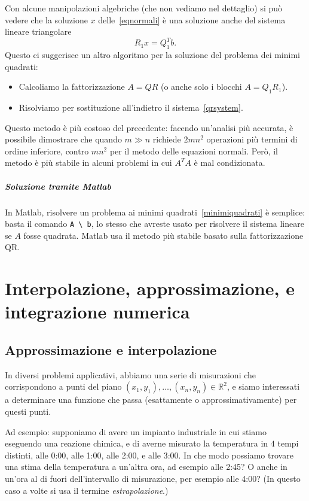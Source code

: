 \documentclass[a4paper]{report}
\theoremstyle{definiton}
\theoremstyle{remark}
\begin{document}
Con alcune manipolazioni algebriche (che non vediamo nel dettaglio) si può vedere che la soluzione $x$ delle~\eqref{eqnormali} è una soluzione anche del sistema lineare triangolare
\begin{equation} \label{qrsystem}
    R_1 x = Q_1^T b.    
\end{equation}
Questo ci suggerisce un altro algoritmo per la soluzione del problema dei minimi quadrati:
\begin{itemize}
    \item Calcoliamo la fattorizzazione $A=QR$ (o anche solo i blocchi $A = Q_1 R_1$).
    \item Risolviamo per sostituzione all'indietro il sistema~\eqref{qrsystem}.
\end{itemize}
Questo metodo è più costoso del precedente: facendo un'analisi più accurata, è possibile dimostrare che quando $m\gg n$ richiede $2mn^2$ operazioni più termini di ordine inferiore, contro $mn^2$ per il metodo delle equazioni normali. Però, il metodo è più stabile in alcuni problemi in cui $A^TA$ è mal condizionata.

\paragraph{Soluzione tramite Matlab} In Matlab, risolvere un problema ai minimi quadrati~\eqref{minimiquadrati} è semplice: basta il comando \lstinline{A \ b}, lo stesso che avreste usato per risolvere il sistema lineare se $A$ fosse quadrata. Matlab usa il metodo più stabile basato sulla fattorizzazione QR.

\chapter{Interpolazione, approssimazione, e integrazione numerica}

\section{Approssimazione e interpolazione}

In diversi problemi applicativi, abbiamo una serie di misurazioni che corrispondono a punti del piano $(x_1, y_1), \dots, (x_n, y_n) \in \mathbb{R}^2$, e siamo interessati a determinare una funzione che passa (esattamente o approssimativamente) per questi punti.

Ad esempio: supponiamo di avere un impianto industriale in cui stiamo eseguendo una reazione chimica, e di averne misurato la temperatura in $4$ tempi distinti, alle 0:00, alle 1:00, alle 2:00, e alle 3:00. In che modo possiamo trovare una stima della temperatura a un'altra ora, ad esempio alle 2:45? O anche in un'ora al di fuori dell'intervallo di misurazione, per esempio alle 4:00? (In questo caso a volte si usa il termine \emph{estrapolazione}.)
\end{document}
